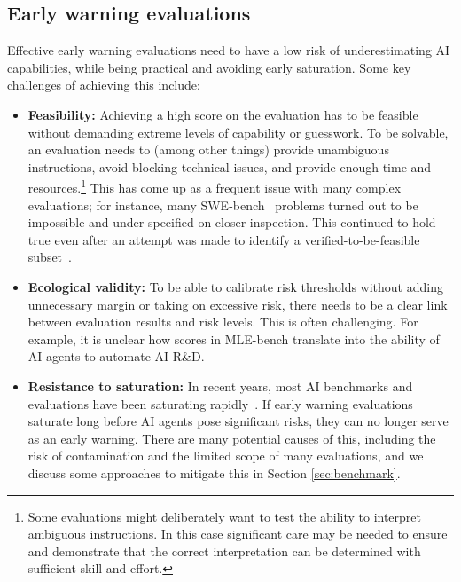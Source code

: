 \documentclass{article}
\newcommand{\EvalName}{RE-Bench}
\begin{document}
\subsection{Early warning evaluations}
\label{subsec:early_warning}

Effective early warning evaluations need to have a low risk of underestimating AI capabilities, while being practical and avoiding early saturation. Some key challenges of achieving this include:

\begin{itemize}
    \item \textbf{Feasibility:} Achieving a high score on the evaluation has to be feasible without demanding extreme levels of capability or guesswork. To be solvable, an evaluation needs to (among other things) provide unambiguous instructions, avoid blocking technical issues, and provide enough time and resources.\footnote{Some evaluations might deliberately want to test the ability to interpret ambiguous instructions. In this case significant care may be needed to ensure and demonstrate that the correct interpretation can be determined with sufficient skill and effort.} This has come up as a frequent issue with many complex evaluations; for instance, many SWE-bench~\cite{jimenez2023swebench} problems turned out to be impossible and under-specified on closer inspection. This continued to hold true even after an attempt was made to identify a verified-to-be-feasible subset~\cite{anthropic2024swebench}. 
    
    \item \textbf{Ecological validity:} To be able to calibrate risk thresholds without adding unnecessary margin or taking on excessive risk, there needs to be a clear link between evaluation results and risk levels. This is often challenging. For example, it is unclear how scores in MLE-bench translate into the ability of AI agents to automate AI R\&D.

    \item \textbf{Resistance to saturation:} In recent years, most AI benchmarks and evaluations have been saturating rapidly~\cite{maslej2024artificialintelligenceindexreport}. If early warning evaluations saturate long before AI agents pose significant risks, they can no longer serve as an early warning. There are many potential causes of this, including the risk of contamination and the limited scope of many evaluations, and we discuss some approaches to mitigate this in Section \ref{sec:benchmark}.
\end{itemize}
\end{document}

